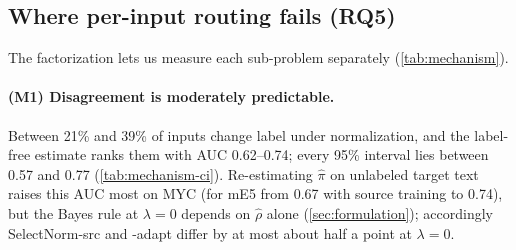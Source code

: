 \subsection{Where per-input routing fails (RQ5)}
\label{sec:mechanism}
\begin{table}[t]
\centering\footnotesize\setlength{\tabcolsep}{3.2pt}
\resizebox{\textwidth}{!}{}
\caption{The four mechanisms of \cref{sec:formulation} ($T_{\rm cons}$, Arabic-script classifier, mean of five seeds). (M1) disagreement rate (\%) and AUC of label-free, target-cross-fitted $\hat\pi$. (M2) win rate of $T(x)$ on disagreements (\%), AUC of source-trained $\hat\rho$, AUC of a diagnostic $\hat\rho$ cross-validated on target labels (not deployable), and calibration gap of source $\hat\rho$ (points). (M3) macro-F1 gain over the best single view of the rule $\hat\rho>\nicefrac12$ with source and with target-CV $\hat\rho$. (M4) oracle headroom over the best view, and the same minus the headroom between two bootstrap-resampled classifiers on the same input (a diagnostic reference, not a decomposition; see \cref{tab:noise}). $^\circ$: the 95\% interval of the AUC contains 0.5; $^{*}$: the interval of the gap or gain excludes 0 (1{,}000 seed-averaged bootstrap resamples; all intervals in \cref{tab:mechanism-ci}). Test labels are used for analysis only.}
\label{tab:mechanism}
\end{table}
The factorization lets us measure each sub-problem separately (\cref{tab:mechanism}).

\paragraph{(M1) Disagreement is moderately predictable.} Between 21\% and 39\% of inputs change label under normalization, and the label-free estimate ranks them with AUC 0.62--0.74; every 95\% interval lies between 0.57 and 0.77 (\cref{tab:mechanism-ci}). Re-estimating $\hat\pi$ on unlabeled target text raises this AUC most on MYC (for mE5 from 0.67 with source training to 0.74), but the Bayes rule at $\lambda=0$ depends on $\hat\rho$ alone (\cref{sec:formulation}); accordingly SelectNorm-src and -adapt differ by at most about half a point at $\lambda=0$.

